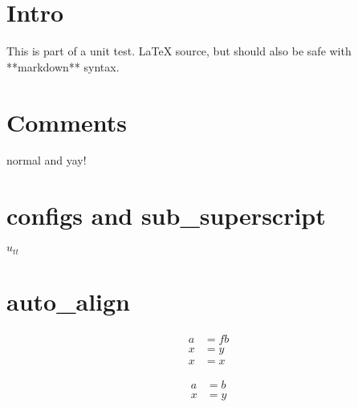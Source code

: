 \documentclass[12pt]{article}
\begin{document}
\section{Intro}
This is part of a unit test. \LaTeX{} source, but should also be safe with **markdown** syntax.

\section{Comments}
normal %
and
yay!

\section{configs and sub_superscript}
$u_{tt}$

\section{auto_align}
\begin {align}
a &= fb \\ %
x &= y \label{$u_tt$} \\
x&=x
\end{align}

\begin {align}
a &= b \\

x &= y
\end{align}
\end{document}

